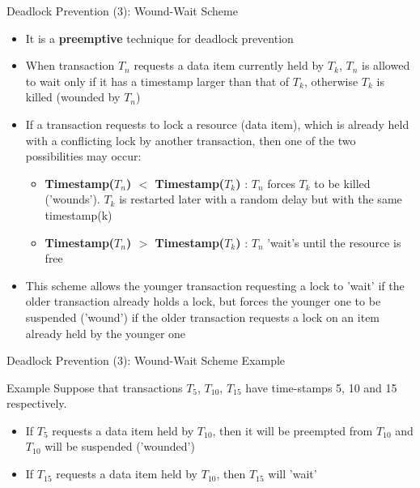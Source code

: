 \documentclass[aspectratio=169, xcolor=dvipsnames]{beamer}
\begin{document}
\begin{frame}{Deadlock Prevention (3): Wound-Wait Scheme}
    \begin{itemize}[<+->]
        \item It is a \textbf{preemptive} technique for deadlock prevention
        \item When transaction $T_n$ requests a data item currently held by $T_k$, $T_n$ is allowed to wait only if it has a timestamp larger than that of $T_k$, otherwise $T_k$ is killed (wounded by $T_n$)
        \item If a transaction requests to lock a resource (data item), which is already held with a conflicting lock by another transaction, then one of the two possibilities may occur:
        \begin{itemize}
            \item[$\triangleright$] \textbf{Timestamp($T_n$) $<$ Timestamp($T_k$)} : $T_n$ forces $T_k$ to be killed ('wounds'). $T_k$ is restarted later with a random delay but with the same timestamp(k)
            \item[$\triangleright$] \textbf{Timestamp($T_n$) $>$ Timestamp($T_k$)} : $T_n$ 'wait's until the resource is free
        \end{itemize}
        \item This scheme allows the younger transaction requesting a lock to 'wait' if the older transaction already holds a lock, but forces the younger one to be suspended ('wound') if the older transaction requests a lock on an item already held by the younger one
    \end{itemize}
\end{frame}

\begin{frame}{Deadlock Prevention (3): Wound-Wait Scheme Example}
    \begin{exampleblock}{Example}
        Suppose that transactions $T_5$, $T_{10}$, $T_{15}$ have time-stamps 5, 10 and 15 respectively.
        \begin{itemize}
            \item If $T_5$ requests a data item held by $T_{10}$, then it will be preempted from $T_{10}$ and $T_{10}$ will be suspended ('wounded')
            \item If $T_{15}$ requests a data item held by $T_{10}$, then $T_{15}$ will 'wait'
        \end{itemize}
    \end{exampleblock}
\end{frame}
\end{document}
